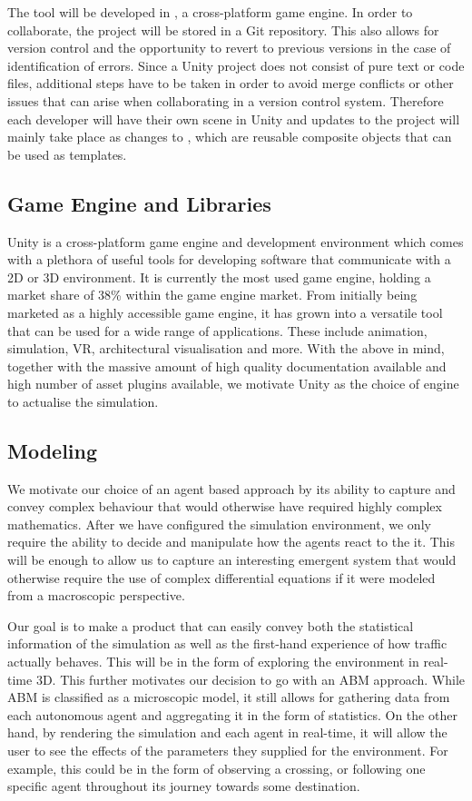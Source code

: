 The tool will be developed in , a cross-platform game engine. In order to collaborate, the project will be stored in a Git repository. This also allows for version control and the opportunity to revert to previous versions in the case of identification of errors. Since a Unity project does not consist of pure text or code files, additional steps have to be taken in order to avoid merge conflicts or other issues that can arise when collaborating in a version control system. Therefore each developer will have their own scene in Unity and updates to the project will mainly take place as changes to , which are reusable composite objects that can be used as templates.

\subsection{Game Engine and Libraries}
    Unity is a cross-platform game engine and development environment which comes with a plethora of useful tools for developing software that communicate with a 2D or 3D environment. It is currently the most used game engine, holding a market share of 38\% within the game engine market\cite{unity-market-share}. From initially being marketed as a highly accessible game engine, it has grown into a versatile tool that can be used for a wide range of applications. These include animation, simulation, VR, architectural visualisation and more. With the above in mind, together with the massive amount of high quality documentation available and high number of asset plugins available, we motivate Unity as the choice of engine to actualise the simulation.

\subsection{Modeling}
    We motivate our choice of an agent based approach by its ability to capture and convey complex behaviour that would otherwise have required highly complex mathematics. After we have configured the simulation environment, we only require the ability to decide and manipulate how the agents react to the it. This will be enough to allow us to capture an interesting emergent system that would otherwise require the use of complex differential equations if it were modeled from a macroscopic perspective.

    Our goal is to make a product that can easily convey both the statistical information of the simulation as well as the first-hand experience of how traffic actually behaves. This will be in the form of exploring the environment in real-time 3D. This further motivates our decision to go with an ABM approach. While ABM is classified as a microscopic model, it still allows for gathering data from each autonomous agent and aggregating it in the form of statistics. On the other hand, by rendering the simulation and each agent in real-time, it will allow the user to see the effects of the parameters they supplied for the environment. For example, this could be in the form of observing a crossing, or following one specific agent throughout its journey towards some destination.

